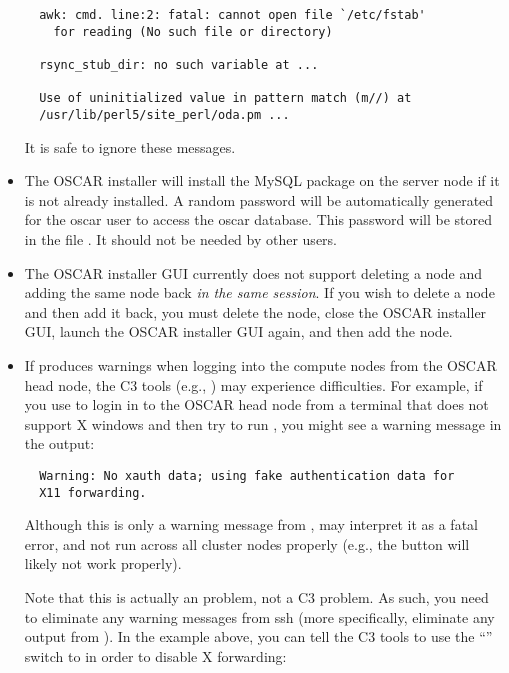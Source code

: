 \begin{itemize}
\begin{verbatim}
  awk: cmd. line:2: fatal: cannot open file `/etc/fstab'
    for reading (No such file or directory)

  rsync_stub_dir: no such variable at ...

  Use of uninitialized value in pattern match (m//) at
  /usr/lib/perl5/site_perl/oda.pm ...
\end{verbatim}

  It is safe to ignore these messages.

\item The OSCAR installer will install the MySQL package on the server
  node if it is not already installed.  A random password will be automatically
  generated for the oscar user to access the oscar database.  This
  password will be stored in the file .  It should
  not be needed by other users.

\item The OSCAR installer GUI currently does not support deleting a
  node and adding the same node back {\em in the same session}.  If
  you wish to delete a node and then add it back, you must delete the
  node, close the OSCAR installer GUI, launch the OSCAR installer GUI
  again, and then add the node.

\item If  produces warnings when logging into the compute
  nodes from the OSCAR head node, the C3 tools (e.g., ) may
  experience difficulties.  For example, if you use  to login
  in to the OSCAR head node from a terminal that does not support X
  windows and then try to run , you might see a warning
  message in the  output:

\begin{verbatim}
  Warning: No xauth data; using fake authentication data for
  X11 forwarding.
\end{verbatim}

  Although this is only a warning message from , 
  may interpret it as a fatal error, and not run across all cluster
  nodes properly (e.g., the  button
  will likely not work properly).

  Note that this is actually an  problem, not a C3 problem.
  As such, you need to eliminate any warning messages from ssh (more
  specifically, eliminate any output from ).  In the
  example above, you can tell the C3 tools to use the ``''
  switch to  in order to disable X forwarding:


\end{itemize}
